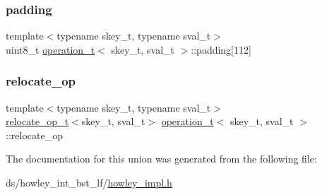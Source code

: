 \mbox{\label{unionoperation__t_a31d6c729884c52c6b10b2038fbce49dc}} 
\subsubsection{\texorpdfstring{padding}{padding}}
{\footnotesize\ttfamily template$<$typename skey\+\_\+t, typename sval\+\_\+t$>$ \\
uint8\+\_\+t \hyperlink{unionoperation__t}{operation\+\_\+t}$<$ skey\+\_\+t, sval\+\_\+t $>$\+::padding\mbox{[}112\mbox{]}}

\mbox{\label{unionoperation__t_a8604de36b950c8d7218afde0bb69678c}} 
\subsubsection{\texorpdfstring{relocate\+\_\+op}{relocate\_op}}
{\footnotesize\ttfamily template$<$typename skey\+\_\+t, typename sval\+\_\+t$>$ \\
\hyperlink{structrelocate__op__t}{relocate\+\_\+op\+\_\+t}$<$skey\+\_\+t, sval\+\_\+t$>$ \hyperlink{unionoperation__t}{operation\+\_\+t}$<$ skey\+\_\+t, sval\+\_\+t $>$\+::relocate\+\_\+op}



The documentation for this union was generated from the following file\+:\begin{DoxyCompactItemize}
\item 
ds/howley\+\_\+int\+\_\+bst\+\_\+lf/\hyperlink{howley__impl_8h}{howley\+\_\+impl.\+h}\end{DoxyCompactItemize}

